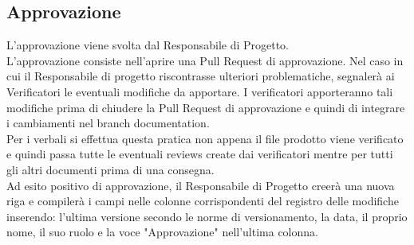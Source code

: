\subsection{Approvazione}
L’approvazione viene svolta dal Responsabile di Progetto.\\
L'approvazione consiste nell'aprire una Pull Request di approvazione. Nel caso in cui il Responsabile di progetto riscontrasse ulteriori problematiche, segnalerà ai Verificatori le eventuali modifiche da apportare. I verificatori apporteranno tali modifiche prima di chiudere la Pull Request di approvazione e quindi di integrare i cambiamenti nel branch documentation.\\
Per i verbali si effettua questa pratica non appena il file prodotto viene verificato e quindi passa tutte le eventuali reviews create dai verificatori mentre per tutti gli altri documenti prima di una consegna.\\
Ad esito positivo di approvazione, il Responsabile di Progetto creerà una nuova riga e compilerà i campi nelle colonne corrispondenti del registro delle modifiche inserendo: l'ultima versione secondo le norme di versionamento, la data, il proprio nome, il suo ruolo e la voce "Approvazione" nell'ultima colonna.